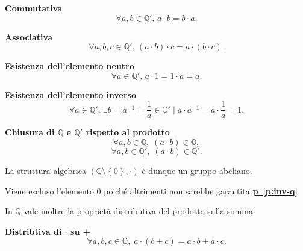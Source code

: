 \begin{property}
    \textbf{Commutativa}
    \[\forall a, b \in \mathbb{Q}', \, a \cdot b = b \cdot a.\]
\end{property}
\begin{property}
    \textbf{Associativa}
    \[\forall a, b, c \in \mathbb{Q}', \, (a \cdot b) \cdot c = a \cdot (b \cdot c).\]
\end{property}
\begin{property}
    \textbf{Esistenza dell'elemento neutro}
    \[\forall a \in \mathbb{Q}', \, a \cdot 1 = 1 \cdot a = a.\]
\end{property}
\begin{property}
    \label{p:inv-q}
    \textbf{Esistenza dell'elemento inverso}
    \[\forall a \in \mathbb{Q}', \, \exists b = a^{-1} = \frac{1}{a} \in \mathbb{Q}' \mid a \cdot a^{-1} = a \cdot \frac{1}{a} = 1.\]
\end{property}
\begin{property}
    \textbf{Chiusura di $\mathbb{Q}$ e $\mathbb{Q}'$ rispetto al prodotto}
    \label{p:raz-chi-pro}
    \[\forall a, b \in \mathbb{Q}, \; (a \cdot b) \in \mathbb{Q},\]
    \[\forall a, b \in \mathbb{Q}', \; (a \cdot b) \in \mathbb{Q}'.\]
\end{property}
La struttura algebrica $(\mathbb{Q} \setminus \left\{0\right\}, \cdot)$ è dunque un gruppo abeliano.

\begin{observation}
    Viene escluso l'elemento 0 poiché altrimenti non sarebbe garantita \hyperref[p:inv-q]{\textbf{p~\ref*{p:inv-q}}}
\end{observation}


\vspace{0.4cm}

In $\mathbb{Q}$ vale inoltre la proprietà distributiva del prodotto sulla somma
\begin{property}
    \textbf{Distribtiva di $\cdot$ su +}
    \[\forall a, b, c \in \mathbb{Q}, \; a \cdot (b + c) = a \cdot b + a \cdot c.\]
\end{property}